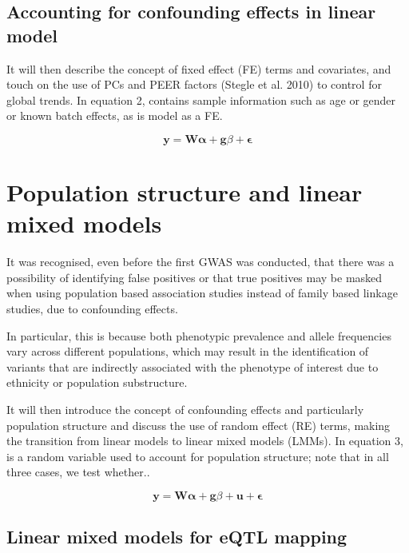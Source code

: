\subsection{Accounting for confounding effects in linear model}

It will then describe the concept of fixed effect (FE) terms and covariates, and touch on the use of PCs and PEER factors (Stegle et al. 2010) to control for global trends. 
In equation 2,  contains sample information such as age or gender or known batch effects, as is model as a FE.

\begin{equation}\label{eq20:Linear_regression_genetics_covariates}
 \mathbf{y} =  \mathbf{W}\boldsymbol{\alpha} + \mathbf{g}\beta + \boldsymbol{\epsilon} 
\end{equation}



\section{Population structure and linear mixed models}

It was recognised, even before the first GWAS was conducted, that there was a possibility of identifying false positives or that true positives may be masked when using population based association studies instead of family based linkage studies, due to confounding effects. 

In particular, this is because both phenotypic prevalence and allele frequencies vary across different populations, which may result in the identification of variants that are indirectly associated with the phenotype of interest due to ethnicity or population substructure.

It will then introduce the concept of confounding effects and particularly population structure and discuss the use of random effect (RE) terms, making the transition from linear models to linear mixed models (LMMs). 
In equation 3,  is a random variable used to account for population structure; note that in all three cases, we test whether..

\begin{equation}\label{eq21:Linear_mixed_model}
 \mathbf{y} =  \mathbf{W}\boldsymbol{\alpha} + \mathbf{g}\beta + \mathbf{u} + \boldsymbol{\epsilon} 
\end{equation}

\subsection{Linear mixed models for eQTL mapping}

